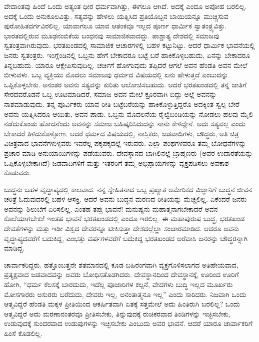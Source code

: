 \vskip 0.2cm

ವೇದಾಂತವು ಹಿಂದೆ ಒಂದು ಅತ್ಯಂತ ಧೀರ ಧರ್ಮವಾಗಿತ್ತು, ಈಗಲೂ ಆಗಿದೆ. ಅದಕ್ಕೆ ಎಂದೂ ಅಪೋಹ ಬರಲಿಲ್ಲ. ಅದಕ್ಕೆ ಒಂದು ಅನುಕೂಲವಿತ್ತು. ಸತ್ಯವನ್ನು ಹೇಳಲು ಯತ್ನಿಸಿದ ಪ್ರತಿಯೊಬ್ಬನ ಬಾಯಿಯನ್ನೂ ಮುಚ್ಚಿಸುವ ಪುರೋಹಿತವರ್ಗವಿರಲಿಲ್ಲ. ಯಾವಾಗಲೂ ಯಾವ ಆತಂಕವೂ ಇಲ್ಲದ ಪೂರ್ಣ ಧಾರ್ಮಿಕ ಸ್ವಾತಂತ್ರ್ಯವಿತ್ತು. ಭಾರತದಲ್ಲಿರುವ ಮೂಢನಂಬಿಕೆಯ ಬಂಧನವು ಸಾಮಾಜಿಕವಾದದ್ದು. ಪಾಶ್ಚಾತ್ಯ ದೇಶದಲ್ಲಿ ಸಮಾಜವು ಸ್ವತಂತ್ರವಾಗಿರುವುದು. ಭರತಖಂಡದಲ್ಲಿ ಸಾಮಾಜಿಕ ಆಚಾರಗಳಲ್ಲಿ ಬಹಳ ಕಟ್ಟುನಿಟ್ಟು. ಆದರೆ ಧಾರ್ಮಿಕ ಭಾವನೆಯಲ್ಲಿ ಜನರು ಸ್ವತಂತ್ರರು. ಇಂಗ್ಲೆಂಡಿನಲ್ಲಿ ಒಬ್ಬನು ಹೇಗೆ ಬೇಕಾದರೂ ಬಟ್ಟೆ ಬರೆ ಹಾಕಿಕೊಳ್ಳಬಹುದು, ಏನನ್ನು ಬೇಕಾದರೂ ತಿನ್ನಬಹುದು. ಯಾರೂ ಆಕ್ಷೇಪಿಸುವುದಿಲ್ಲ. ಚರ್ಚಿಗೆ ಹೋಗುವುದು ತಪ್ಪಿದರೆ ಆಗಲೆ ಅವನ ಹೆಂಡತಿ ಅವನ ಮೇಲೆ ಬೀಳುವಳು. ಒಬ್ಬ ವ್ಯಕ್ತಿಯು ಮೊದಲು ಸಮಾಜವು ಧರ್ಮದ ವಿಷಯದಲ್ಲಿ ಏನು ಹೇಳುತ್ತದೆ ಎಂಬುದನ್ನು ಒಪ್ಪಿಕೊಳ್ಳಬೇಕು. ಅನಂತರ ಅವನು ಸತ್ಯವನ್ನು ಕುರಿತು ಆಲೋಚಿಸಬಹುದು. ಆದರೆ ಭರತಖಂಡದಲ್ಲಿ ತನ್ನ ಜಾತಿಗೆ ಸೇರದವರೊಡನೆ ಒಬ್ಬ ಊಟಮಾಡಿದರೆ, ಸಮಾಜ ಅವನ ಮೇಲೆ ಕ್ರೂರವಾಗಿ ಬಿದ್ದು ಅಲ್ಲೆ ಅವನನ್ನು ನಾಶಮಾಡುವುದು. ತನ್ನ ಪೂರ್ವಿಕರು ಯಾವ ರೀತಿ ಬಟ್ಟೆಬರೆಯನ್ನು ಹಾಕಿಕೊಳ್ಳುತ್ತಿದ್ದರೊ ಅದಕ್ಕಿಂತ ಸ್ವಲ್ಪ ಬೇರೆ ಅವನು ಯತ್ನಿಸಿದರೂ ಆಯಿತು, ಅವನ ಪಾಡು. ಒಬ್ಬನು ಮೊದಲನೆಯ ರೈಲ್ವೆಬಂಡಿಯನ್ನು ನೋಡಲು ಹಲವು ಮೈಲಿ ನಡೆದುಕೊಂಡು ಹೋದನೆಂದು ಅವನನ್ನು ಸಮಾಜ ಬಹಿಷ್ಕರಿಸಿದುದನ್ನು ನಾನು ಕೇಳಿದ್ದೇನೆ. ಅದು ಸತ್ಯವಲ್ಲ ಎಂದು ಬೇಕಾದರೆ ತಿಳಿದುಕೊಳ್ಳೋಣ. ಆದರೆ ಧರ್ಮದ ವಿಷಯದಲ್ಲಿ, ನಾಸ್ತಿಕರು, ಜಡವಾದಿಗಳು, ಬೌದ್ಧರು, ಅತಿ ಚಿತ್ರ ವಿಚಿತ್ರವಾದ ಭಾವನೆಗಳುಳ್ಳವರು ಇವರೆಲ್ಲ ಪಕ್ಕಪಕ್ಕದಲ್ಲೆ ಇರುವರು. ಎಲ್ಲಾ ಪಂಥಗಳವರೂ ತಮ್ಮ ಬೋಧನೆಗಳನ್ನು ಪ್ರಚಾರ ಮಾಡಿ ಅನುಯಾಯಿಗಳನ್ನು ಪಡೆಯುವರು. ದೇವಸ್ಥಾನದ ಬಾಗಿಲಿನಲ್ಲೆ ಬ್ರಾಹ್ಮಣರು (ಅವರ ಉದಾರತೆಯನ್ನು ಒಪ್ಪಿಕೊಳ್ಳಬೇಕಾಗಿದೆ) ಜಡವಾದಿಗಳಿಗೆ ಮತ್ತು ಇತರರಿಗೆ ತಮ್ಮ ಅಭಿಪ್ರಾಯಗಳನ್ನು ವ್ಯಕ್ತಪಡಿಸಲು ಅವಕಾಶ ಕೊಡುವರು.

\vskip 0.2cm

ಬುದ್ಧನು ಬಹಳ ವೃದ್ಧಾಪ್ಯದಲ್ಲಿ ಕಾಲವಾದ. ನನ್ನ ಸ್ನೇಹಿತನಾದ ಒಬ್ಬ ಪ್ರಖ್ಯಾತ ಅಮೇರಿಕದ ವಿಜ್ಞಾನಿಗೆ ಬುದ್ಧನ ಜೀವನ ಚರಿತ್ರೆ ಓದುವುದರಲ್ಲಿ ಬಹಳ ಆಸಕ್ತಿ. ಆದರೆ ಅವನು ಬುದ್ಧನ ಮರಣದ ರೀತಿಯನ್ನು ಮೆಚ್ಚಲಿಲ್ಲ. ಏಕೆಂದರೆ ಜನರು ಅವನನ್ನು ಶಿಲುಬೆಗೆ ಏರಿಸಲಿಲ್ಲ. ಎಂತಹ ತಪ್ಪು ಭಾವನೆ! ಮನುಷ್ಯನು ಮಹಾತ್ಮನಾಗಬೇಕಾದರೆ ಅವನ ಕೊಲೆಯಾಗಬೇಕು! ಇಂತಹ ಭಾವನೆ ಭರತಖಂಡದಲ್ಲಿ ಎಂದೂ ಇರಲಿಲ್ಲ. ಈ ಮಹಾಪುರುಷ ಬುದ್ಧ, ಭರತಖಂಡ ದೇವತೆಗಳನ್ನು ಮತ್ತು ಇಡೀ ವಿಶ್ವದ ದೇವರನ್ನೂ ಟೀಕಿಸುತ್ತಾ ದೇಶದಲ್ಲೆಲ್ಲಾ ಸಂಚಾರಮಾಡಿದ. ಆದರೂ ಅವನು ವೃದ್ಧಾಪ್ಯದವರೆಗೆ ಬದುಕಿದ್ದ, ಎಂಭತ್ತು ವರ್ಷಗಳವರೆಗೆ ಬದುಕಿದ್ದ ಭರತಖಂಡದ ಅರೆವಾಸಿ ಜನರನ್ನು ಬೌದ್ಧರನ್ನಾಗಿ ಮಾಡಿದ್ದ.

\vskip 0.2cm

ಚಾರ್ವಾಕರಿದ್ದರು. ಹತ್ತೊಂಬತ್ತನೇ ಶತಮಾನದಲ್ಲಿ ಕೂಡ ಬಹಿರಂಗವಾಗಿ ವ್ಯಕ್ತಗೊಳಿಸಲಾಗದ ಅತಿಹೇಯವಾದ, ಪ್ರತ್ಯಕ್ಷವಾದ ಜಡವಾದವನ್ನು ಅವರು ಬೋಧಿಸತೊಡಗಿದರು. ದೇವಸ್ಥಾನದಿಂದ ದೇವಸ್ಥಾನಕ್ಕೆ, ಊರಿಂದ ಊರಿಗೆ ಹೋಗಿ, “ಧರ್ಮ ಕೆಲಸಕ್ಕೆ ಬಾರದುದು, ಇದೆಲ್ಲ ಪೂಜಾರಿಗಳ ಕಲ್ಪನೆ, ವೇದಗಳು ಬುದ್ಧಿ ಇಲ್ಲದ ಮೂರ್ಖರು ಮೋಸಗಾರರು ಅಸುರರು ಬರೆದುದು, ದೇವರು ಇಲ್ಲ, ಅನಂತಾತ್ಮನೂ ಇಲ್ಲ” ಎಂದು ಸಾರಿದರು. ನಿಜವಾಗಿ ಒಂದು ಆತ್ಮವಿದ್ದರೆ ಹೆಂಡತಿ ಮಕ್ಕಳ ಪ್ರೀತಿಯಿಂದ ಆಕರ್ಷಿತವಾಗಿ ಏತಕ್ಕೆ ಸತ್ತಮೇಲೆ ಅದು ಹಿಂತಿರುಗಿ ಬರಲಿಲ್ಲ? ಒಂದು ಆತ್ಮವಿದ್ದರೆ ಅದು ಮರಣಾನಂತರವೂ ಪ್ರೀತಿಸಬೇಕು, ತಿನ್ನುವುದಕ್ಕೆ ರುಚಿಕರವಾದ ತಿಂಡಿಗಳನ್ನು ಇಚ್ಛಿಸಬೇಕು, ಉಡುವುದಕ್ಕೆ ಸುಂದರವಾದ ಉಡುಪುಗಳನ್ನು ಇಚ್ಛಿಸಬೇಕು ಎಂಬುದು ಅವರ ಭಾವನೆ. ಆದರೆ ಯಾರೂ ಚಾರ್ವಾಕರಿಗೆ ಹಿಂಸೆ ಕೊಡಲಿಲ್ಲ.

